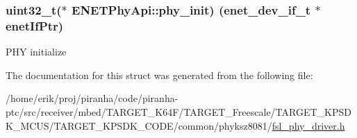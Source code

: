 \subsubsection[{\texorpdfstring{phy\+\_\+init}{phy_init}}]{\setlength{\rightskip}{0pt plus 5cm}uint32\+\_\+t($\ast$  E\+N\+E\+T\+Phy\+Api\+::phy\+\_\+init) ({\bf enet\+\_\+dev\+\_\+if\+\_\+t} $\ast$enet\+If\+Ptr)}\hypertarget{structENETPhyApi_a94209e4105bbdf2cbb6a59f7b1635674}{}\label{structENETPhyApi_a94209e4105bbdf2cbb6a59f7b1635674}
P\+HY initialize 

The documentation for this struct was generated from the following file\+:\begin{DoxyCompactItemize}
\item 
/home/erik/proj/piranha/code/piranha-\/ptc/src/receiver/mbed/\+T\+A\+R\+G\+E\+T\+\_\+\+K64\+F/\+T\+A\+R\+G\+E\+T\+\_\+\+Freescale/\+T\+A\+R\+G\+E\+T\+\_\+\+K\+P\+S\+D\+K\+\_\+\+M\+C\+U\+S/\+T\+A\+R\+G\+E\+T\+\_\+\+K\+P\+S\+D\+K\+\_\+\+C\+O\+D\+E/common/phyksz8081/\hyperlink{fsl__phy__driver_8h}{fsl\+\_\+phy\+\_\+driver.\+h}\end{DoxyCompactItemize}
